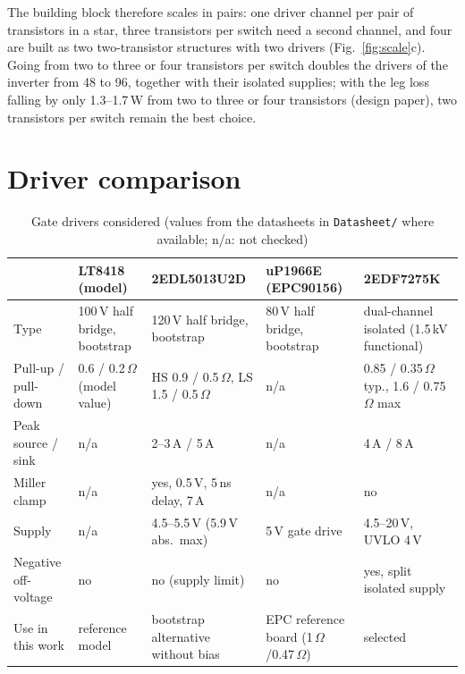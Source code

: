 \documentclass[10pt,a4paper]{article}
\begin{document}
The building block therefore scales in pairs: one driver channel per pair of transistors in a star, three transistors per switch need a second channel, and four are built as two two-transistor structures with two drivers (Fig.~\ref{fig:scale}c). Going from two to three or four transistors per switch doubles the drivers of the inverter from 48 to 96, together with their isolated supplies; with the leg loss falling by only 1.3--1.7\,W from two to three or four transistors (design paper), two transistors per switch remain the best choice.

\section{Driver comparison}
\begin{table}[H]
\centering\small
\caption{Gate drivers considered (values from the datasheets in \texttt{Datasheet/} where available; n/a: not checked)}
\label{tab:drivers}
\setlength{\tabcolsep}{3.5pt}
\begin{tabularx}{\textwidth}{@{}lXXXX@{}}
\toprule
 & LT8418 (model) & 2EDL5013U2D & uP1966E (EPC90156) & \textbf{2EDF7275K} \\
\midrule
Type & 100\,V half bridge, bootstrap & 120\,V half bridge, bootstrap & 80\,V half bridge, bootstrap & dual-channel isolated (1.5\,kV functional) \\
Pull-up / pull-down & 0.6 / 0.2\,$\Omega$ (model value) & HS 0.9 / 0.5\,$\Omega$, LS 1.5 / 0.5\,$\Omega$ & n/a & 0.85 / 0.35\,$\Omega$ typ., 1.6 / 0.75\,$\Omega$ max \\
Peak source / sink & n/a & 2--3\,A / 5\,A & n/a & 4\,A / 8\,A \\
Miller clamp & n/a & yes, 0.5\,V, 5\,ns delay, 7\,A & n/a & no \\
Supply & n/a & 4.5--5.5\,V (5.9\,V abs.\ max) & 5\,V gate drive & 4.5--20\,V, UVLO 4\,V \\
Negative off-voltage & no & no (supply limit) & no & yes, split isolated supply \\
Use in this work & reference model & bootstrap alternative without bias & EPC reference board (1\,$\Omega$/0.47\,$\Omega$) & selected \\
\bottomrule
\end{tabularx}
\end{table}
\end{document}
